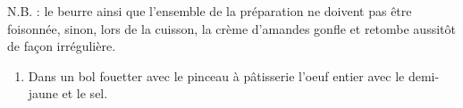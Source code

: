 N.B. : le beurre ainsi que l'ensemble de la préparation ne doivent pas
être foisonnée, sinon, lors de la cuisson, la crème d'amandes gonfle
et retombe aussitôt de façon irrégulière.



\begin{ingredients}
\end{ingredients}


\begin{recipe}
  \begin{enumerate}

  \item Dans un bol fouetter avec le pinceau à pâtisserie l’oeuf
    entier avec le demi-jaune et le sel.

  \end{enumerate}
\end{recipe}



